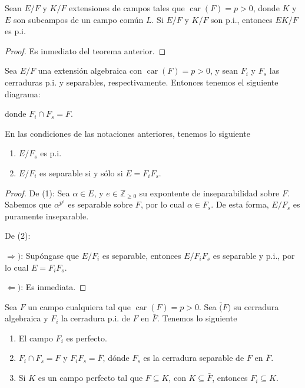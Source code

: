 \documentclass[12pt]{report}
\theoremstyle{largebreak}
\DeclareMathOperator{\car}{car}
\begin{document}
    \begin{cor}
        Sean $E/F$ y $K/F$ extensiones de campos tales que $\car(F)=p>0$, donde $K$ y $E$ son subcampos de un campo común $L$. Si $E/F$ y $K/F$ son p.i., entonces $EK/F$ es p.i.  
    \end{cor}

    \begin{proof}
        Es inmediato del teorema anterior.
    \end{proof}

    Sea $E/F$ una extensión algebraica con $\car(F)=p>0$, y sean $F_i$ y $F_s$ las cerraduras p.i. y separables, respectivamente. Entonces tenemos el siguiente diagrama:


    donde $F_i\cap F_s=F$.

    \begin{propo}
        En las condiciones de las notaciones anteriores, tenemos lo siguiente
        \begin{enumerate}
            \item $E/F_s$ es p.i.
            \item $E/F_i$ es separable si y sólo si $E=F_iF_s$.
        \end{enumerate}
    \end{propo}

    \begin{proof}
        De (1): Sea $\alpha\in E$, y $e\in\mathbb{Z}_{\geq0}$ su expontente de inseparabilidad sobre $F$. Sabemos que $\alpha^{p^e}$ es separable sobre $F$, por lo cual $\alpha\in F_s$. De esta forma, $E/F_s$ es puramente inseparable.

        De (2):

        $\Rightarrow)$: Supóngase que $E/F_i$ es separable, entonces $E/F_iF_s$ es separable y p.i., por lo cual $E=F_iF_s$.

        $\Leftarrow)$: Es inmediata.
    \end{proof}

    \begin{propo}
        Sea $F$ un campo cualquiera tal que $\car(F)=p>0$. Sea $\bar(F)$ su cerradura algebraica y $F_i$ la cerradura p.i. de $F$ en $\bar{F}$. Tenemos lo siguiente
        \begin{enumerate}
            \item El campo $F_i$ es perfecto.
            \item $F_i\cap F_s=F$ y $F_iF_s=\bar{F}$, dónde $F_s$ es la cerradura separable de $F$ en $\bar{F}$.
            \item Si $K$ es un campo perfecto tal que $F\subseteq K$, con $K\subseteq\bar{F}$, entonces $F_i\subseteq K$.
        \end{enumerate}
    \end{propo}
\end{document}
